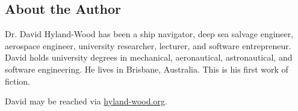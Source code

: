 % 
% 

\vspace*{\fill}
\begin{center}
\section*{\textbf{About the Author}}
\end{center}


Dr. David Hyland-Wood has been a ship navigator, deep sea salvage engineer, aerospace engineer, university researcher, lecturer, and software entrepreneur. David holds university degrees in mechanical, aeronautical, astronautical, and software engineering. He lives in Brisbane, Australia. This is his first work of fiction.

David may be reached via \href{hyland-wood.org}{hyland-wood.org}.
\vspace*{\fill}
